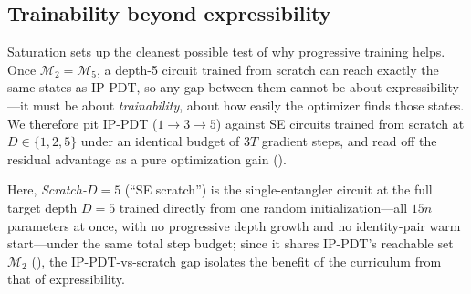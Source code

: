 \documentclass[11pt]{article}
\newcommand{\cM}{\mathcal{M}}
\theoremstyle{plain}
\theoremstyle{plain}
\begin{document}


\subsection{Trainability beyond expressibility}\label{sec:exp_trainability}
Saturation sets up the cleanest possible test of why progressive training
helps.  Once $\mathcal{M}_2=\mathcal{M}_5$, a depth-5 circuit trained from
scratch can reach exactly the same states as IP-PDT, so any gap between
them cannot be about expressibility---it must be about
\emph{trainability}, about how easily the optimizer finds those states.
We therefore pit IP-PDT ($1{\to}3{\to}5$) against SE circuits trained
from scratch at $D\in\{1,2,5\}$ under an identical budget of $3T$
gradient steps, and read off the residual advantage as a pure
optimization gain ().

Here, \emph{Scratch-$D = 5$} (``SE scratch'') is the single-entangler circuit at the
  full target depth $D = 5$ trained directly from one random initialization---all
  $15n$ parameters at once, with no progressive depth growth and no identity-pair
  warm start---under the same total step budget; since it shares IP-PDT's reachable
  set $\cM_2$ (), the IP-PDT-vs-scratch gap isolates the
  benefit of the curriculum from that of expressibility.
  
\end{document}
